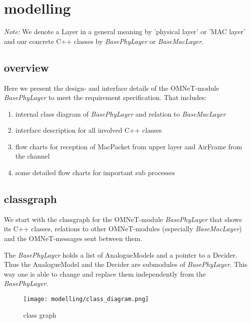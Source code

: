 \newcommand{\h}[1]{\textit{#1}}
\newcommand{\bp}{BasePhyLayer}
\newcommand{\bm}{BaseMacLayer}


\section{modelling}

\emph{Note: }We denote a Layer in a general meaning by 'physical layer' 
or 'MAC layer' and our concrete C++ classes by \h{\bp} or \h{\bm}.

\subsection{overview}

Here we present the design- and interface details of the OMNeT-module 
\h{\bp} to meet the requirement specification. That includes:

\begin{enumerate}
 \item internal class diagram of \h{\bp} and relation to \h{\bm}
 \item interface description for all involved C++ classes
 \item flow charts for reception of MacPacket from upper layer and 
 AirFrame from the channel
 \item some detailed flow charts for important sub processes
\end{enumerate}


\subsection{classgraph}

We start with the classgraph for the OMNeT-module \h{\bp} that shows 
its C++ classes, relations to other OMNeT-modules (especially \h{\bm})
and the OMNeT-messages sent between them.

The \h{\bp} holds a list of AnalogueModels and a pointer to a Decider. Thus the AnalogueModel and the Decider are submodules of \h{\bp}. This way one is able to change and replace them independently from the \h{\bp}.

\begin{figure}[H]
 \centering
 \texttt{[image: modelling/class\_diagram.png]}
 \caption{class graph}
 \label{fig: classgraph}
\end{figure}


